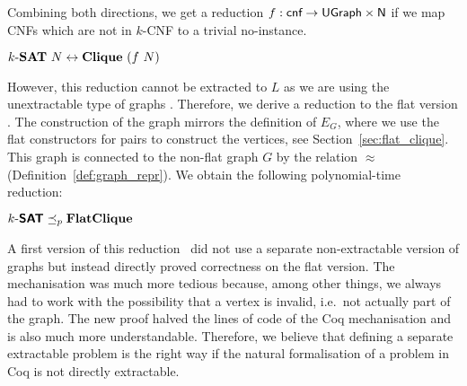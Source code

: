 Combining both directions, we get a reduction $f : \textsf{cnf} \rightarrow \textsf{UGraph} \times \mathsf{N}$ if we map CNFs which are not in $k$-CNF to a trivial no-instance.
\begin{theorem}
  $\text{$k$-\textbf{SAT}{}}~N \leftrightarrow \textbf{Clique}{}~(f~N)$
\end{theorem}

However, this reduction cannot be extracted to $L$ as we are using the unextractable type of graphs \UGraph. 
Therefore, we derive a reduction to the flat version \FlatClique{}. The construction of the graph mirrors the definition of $E_G$, where we use the flat constructors for pairs to construct the vertices, see Section~\ref{sec:flat_clique}. 
This graph is connected to the non-flat graph $G$ by the relation $\approx$ (Definition~\ref{def:graph_repr}). 
We obtain the following polynomial-time reduction:
\begin{theorem}
  $\textsf{$k$-\textbf{SAT}{}} \preceq_p{} \textbf{FlatClique}{}$
\end{theorem}

\begin{remark}
  A first version of this reduction~\cite{memo_clique} did not use a separate non-extractable version of graphs but instead directly proved correctness on the flat version. 
  The mechanisation was much more tedious because, among other things, we always had to work with the possibility that a vertex is invalid, i.e.\ not actually part of the graph. 
  The new proof halved the lines of code of the Coq mechanisation and is also much more understandable. Therefore, we believe that defining a separate extractable problem is the right way if the natural formalisation of a problem in Coq is not directly extractable.
\end{remark}
